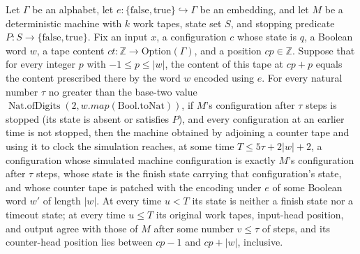 \begin{theorem}
\label{Turing.sc_finish}
\leanok
{}
Let $\Gamma$ be an alphabet, let
$e:\{\mathrm{false},\mathrm{true}\}\hookrightarrow\Gamma$ be an embedding, and let $M$
be a deterministic machine with $k$ work tapes, state set $S$, and stopping predicate
$P:S\to\{\mathrm{false},\mathrm{true}\}$. Fix an input $x$, a configuration $c$ whose
state is $q$, a Boolean word $w$, a tape content $ct:\mathbb
Z\to\mathrm{Option}(\Gamma)$, and a position $cp\in\mathbb Z$. Suppose that for every
integer $p$ with $-1\le p\le |w|$, the content of this tape at $cp+p$ equals the content
prescribed there by the word $w$ encoded using $e$. For every natural number $\tau$ no
greater than the base-two value $\operatorname{Nat.ofDigits}(2,
w.map(\mathrm{Bool.toNat}))$, if $M$'s configuration after $\tau$ steps is stopped (its
state is absent or satisfies $P$), and every configuration at an earlier time is not
stopped, then the machine obtained by adjoining a counter tape and using it to clock the
simulation reaches, at some time $T\le 5\tau+2|w|+2$, a configuration whose simulated
machine configuration is exactly $M$'s configuration after $\tau$ steps, whose state is
the finish state carrying that configuration's state, and whose counter tape is patched
with the encoding under $e$ of some Boolean word $w'$ of length $|w|$. At every time
$u<T$ its state is neither a finish state nor a timeout state; at every time $u\le T$
its original work tapes, input-head position, and output agree with those of $M$ after
some number $v\le\tau$ of steps, and its counter-head position lies between $cp-1$ and
$cp+|w|$, inclusive.
\end{theorem}


